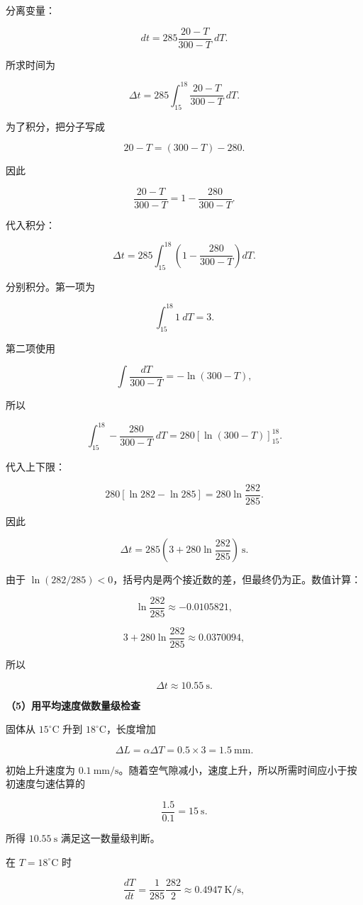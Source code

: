 \documentclass[12pt,a4paper,UTF8]{ctexart}
\begin{document}
分离变量：

\[dt=285\frac{20-T}{300-T}\ dT.\]

所求时间为

\[\Delta t=285\int_{15}^{18}
\frac{20-T}{300-T}\ dT.\]

为了积分，把分子写成

\[20-T=(300-T)-280.\]

因此

\[\frac{20-T}{300-T}
=1-\frac{280}{300-T}.\]

代入积分：

\[\Delta t=285\int_{15}^{18}
\left(1-\frac{280}{300-T}\right)dT.\]

分别积分。第一项为

\[\int_{15}^{18}1\ dT=3.\]

第二项使用

\[\int\frac{dT}{300-T}=-\ln(300-T),\]

所以

\[\int_{15}^{18}-\frac{280}{300-T}\ dT
=280\left[\ln(300-T)\right]_{15}^{18}.\]

代入上下限：

\[280[\ln282-\ln285]
=280\ln\frac{282}{285}.\]

因此

\[\boxed{
\Delta t=285\left(3+280\ln\frac{282}{285}\right)\ \mathrm s
}.\]

由于
\(\ln(282/285)<0\)，括号内是两个接近数的差，但最终仍为正。数值计算：

\[\ln\frac{282}{285}\approx-0.0105821,\]

\[3+280\ln\frac{282}{285}\approx0.0370094,\]

所以

\[\boxed{\Delta t\approx10.55\ \mathrm s}.\]

\textbf{（5）用平均速度做数量级检查}

固体从 \(15^\circ\mathrm C\) 升到 \(18^\circ\mathrm C\)，长度增加

\[\Delta L=\alpha\Delta T
=0.5\times3=1.5\ \mathrm{mm}.\]

初始上升速度为
\(0.1\ \mathrm{mm/s}\)。随着空气隙减小，速度上升，所以所需时间应小于按初速度匀速估算的

\[\frac{1.5}{0.1}=15\ \mathrm s.\]

所得 \(10.55\ \mathrm s\) 满足这一数量级判断。

在 \(T=18^\circ\mathrm C\) 时

\[\frac{dT}{dt}=\frac1{285}\frac{282}{2}
\approx0.4947\ \mathrm{K/s},\]
\end{document}
